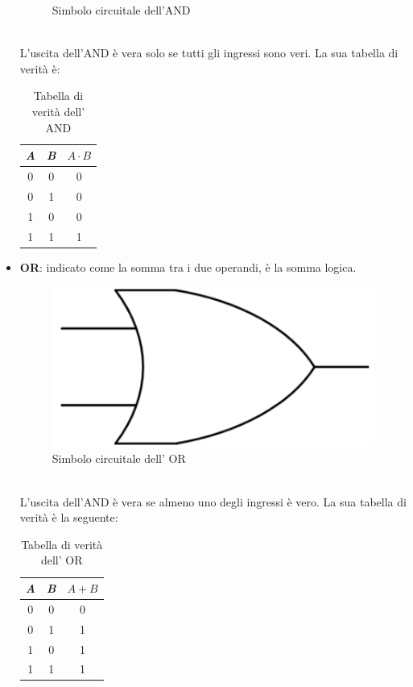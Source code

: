 \documentclass[12pt, a4paper]{report}
\begin{document}
\begin{itemize}
\begin{figure}[h]
        \caption{Simbolo circuitale dell'AND}
    \end{figure}
    \\L'uscita dell'AND è vera solo se tutti gli ingressi sono veri. La sua tabella di verità è:
    \begin{table}[ht]
        \centering
        \begin{tabular}{c c |c}
        \em A &\em B &$A \cdot B$\\\hline
        0 &0 &0\\
        0 &1 &0\\
        1 &0 &0\\
        1 &1 &1
        \end{tabular}
        \caption{Tabella di verità dell' AND}
    \end{table}
    \item\textbf{OR}: indicato come la somma tra i due operandi, è la somma logica.
    \begin{figure}[h]
        \centering
        \includegraphics[scale=0.5,angle=0]{logica_or.png}
        \caption{Simbolo circuitale dell' OR}
    \end{figure}
    \\L'uscita dell'AND è vera se almeno uno degli ingressi è vero. La sua tabella di verità è la seguente:
    \begin{table}[h]
        \centering
        \begin{tabular}{c c |c}
        \em A &\em B &$A + B$\\\hline
        0 &0 &0\\
        0 &1 &1\\
        1 &0 &1\\
        1 &1 &1
        \end{tabular}
        \caption{Tabella di verità dell' OR}
    \end{table}
\end{itemize}
\end{document}
